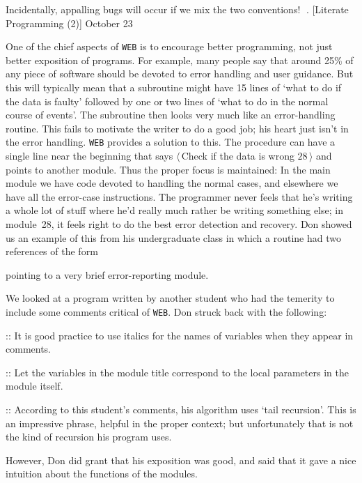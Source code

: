 \smallskip\noindent
Incidentally, appalling bugs will occur if we mix the two conventions!
. [Literate Programming (2)] \pmr October 23

One of the chief aspects of {\tt WEB} is to
encourage better programming, not just better exposition of programs.
For example, many people say that around 25\%
of any piece of software should be devoted to error handling and
user guidance. But this will typically mean that a subroutine might
have 15 lines of `what to do if the data is faulty' followed by one or
two lines of `what to do in the normal course of events'. The subroutine then looks
very much like an error-handling routine. This 
fails to motivate the writer to do a good job; his heart just isn't in
the error handling. {\tt WEB} provides a solution to this. The procedure can
have a single line near the beginning that says $\langle\,$Check if the data
is wrong ${\scriptstyle 28}\,\rangle$ 
and points to another module. Thus the proper focus is
maintained: In the main module we have code devoted to handling the
normal cases, and elsewhere we have all the error-case instructions.
The programmer never feels that he's writing a whole lot of stuff
where he'd really much rather be writing something else; in module~28,
it feels right to do the best error detection and recovery.
Don showed us
an example of this from his undergraduate class in which a routine had
two references of the form

\smallskip
{}

\smallskip\noindent
pointing to a very brief error-reporting module. 

We looked at a program written by another student who had the temerity to
include some comments critical of {\tt WEB}. Don struck back with the following:

\smallskip
\display 30pt::
  It is good practice to use italics for the names of variables when they
appear in comments.

\smallskip
\display 30pt::
  Let the variables in the module title correspond to the local
  parameters in the module itself.

\smallskip
\display 30pt::
  According to this student's comments, his algorithm uses `tail recursion'.
  This is an impressive phrase, helpful in the proper context;
but unfortunately that is not the kind of recursion his program uses.

\smallskip
However, Don did grant that his exposition was good, and said that
it gave a nice intuition about the functions of the modules.

